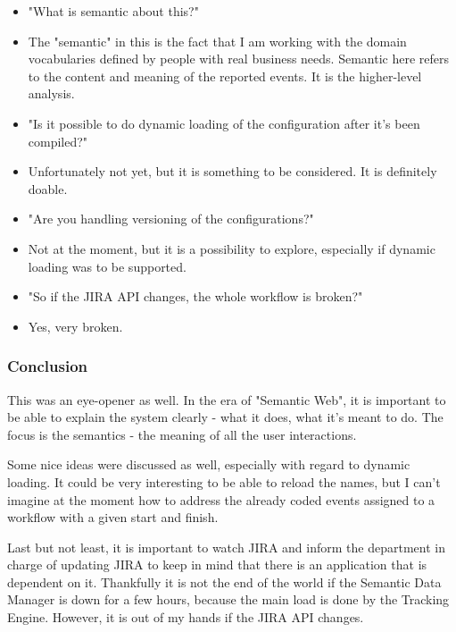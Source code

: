 \begin{itemize}
	\item "What is semantic about this?"
	\item[] The "semantic" in this is the fact that I am working with the domain vocabularies defined by people with real business needs. Semantic here refers to the content and meaning of the reported events. It is the higher-level analysis.
	
	\item "Is it possible to do dynamic loading of the configuration after it's been compiled?"
	\item[] Unfortunately not yet, but it is something to be considered. It is definitely doable.
	
	\item "Are you handling versioning of the configurations?"
	\item[] Not at the moment, but it is a possibility to explore, especially if dynamic loading was to be supported.
	
	\item "So if the JIRA API changes, the whole workflow is broken?"
	\item[] Yes, very broken.
	
\end{itemize}

\subsubsection*{Conclusion}

This was an eye-opener as well. In the era of "Semantic Web", it is important to be able to explain the system clearly - what it does, what it's meant to do. The focus is the semantics - the meaning of all the user interactions.

Some nice ideas were discussed as well, especially with regard to dynamic loading. It could be very interesting to be able to reload the names, but I can't imagine at the moment how to address the already coded events assigned to a workflow with a given start and finish.

Last but not least, it is important to watch JIRA and inform the department in charge of updating JIRA to keep in mind that there is an application that is dependent on it. Thankfully it is not the end of the world if the Semantic Data Manager is down for a few hours, because the main load is done by the Tracking Engine. However, it is out of my hands if the JIRA API changes.